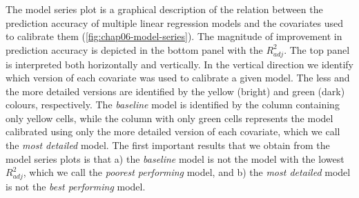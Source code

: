 The model series plot is a graphical description of the relation between the prediction accuracy of multiple 
linear regression models and the covariates used to calibrate them (\autoref{fig:chap06-model-series}). The 
magnitude of improvement in prediction accuracy is depicted in the bottom panel with the ${R}^{2}_{adj}$. The 
top panel is interpreted both horizontally and vertically. In the vertical direction we identify which version 
of each covariate was used to calibrate a given model. The less and the more detailed versions are identified 
by the yellow (bright) and green (dark) colours, respectively. The \emph{baseline} model is identified by the 
column containing only yellow cells, while the column with only green cells represents the model calibrated 
using only the more detailed version of each covariate, which we call the \emph{most detailed} model. The 
first important results that we obtain from the model series plots is that a) the \emph{baseline} model is not 
the model with the lowest ${R}^{2}_{adj}$, which we call the \emph{poorest performing} model, and b) the 
\emph{most detailed} model is not the \emph{best performing} model.

